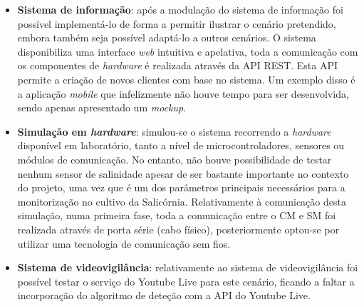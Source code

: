 \begin{itemize}
	
	\item \textbf{Sistema de informação}: após a modulação do sistema de informação foi possível implementá-lo de forma a permitir ilustrar o cenário pretendido, embora também seja possível adaptá-lo a outros cenários. O sistema disponibiliza uma interface \textit{web} intuitiva e apelativa, toda a comunicação com os componentes de \textit{hardware} é realizada através da \ac{API} \ac{REST}. Esta \ac{API} permite a criação de novos clientes com base no sistema. Um exemplo disso é a aplicação \textit{mobile} que infelizmente não houve tempo para ser desenvolvida, sendo apenas apresentado um \textit{mockup}. 
	
	  
	
	\item \textbf{Simulação em \textit{hardware}}: simulou-se o sistema recorrendo a \textit{hardware} disponível em laboratório, tanto a nível de microcontroladores, sensores ou módulos de comunicação. No entanto, não houve possibilidade de testar nenhum sensor de salinidade apesar de ser bastante importante no contexto do projeto, uma vez que é um dos parâmetros principais necessários para a monitorização no cultivo da Salicórnia. Relativamente à comunicação desta simulação, numa primeira fase, toda a comunicação entre o \acl{CM} e \acl{SM} foi realizada através de porta série (cabo físico), posteriormente optou-se por utilizar uma tecnologia de comunicação sem fios. 
	 
	\item \textbf{Sistema de videovigilância}: relativamente ao sistema de videovigilância foi possível testar o serviço do Youtube Live para este cenário, ficando a faltar a incorporação do algoritmo de deteção com a API do Youtube Live. 
	
\end{itemize}
